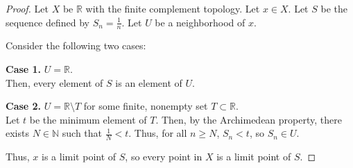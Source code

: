 \documentclass{article}
\newcommand{\R}{\mathbb R}
\begin{document}
\newpage{}
\begin{proof}
    Let $X$ be $\R$ with the finite complement topology.
    Let $x \in X$.
    Let $S$ be the sequence defined by $S_n = \frac1n$.
    Let $U$ be a neighborhood of $x$.

    Consider the following two cases:

    {\bf Case 1.} $U = \R$. \\
    Then, every element of $S$ is an element of $U$.

    {\bf Case 2.} $U = \R \setminus T$ for some finite, nonempty set $T \subset \R$. \\
    Let $t$ be the minimum element of $T$.
    Then, by the Archimedean property, there exists $N \in \mathbb N$ such that $\frac1N < t$.
    Thus, for all $n \geq N$, $S_n < t$, so $S_n \in U$.

    Thus, $x$ is a limit point of $S$, so every point in $X$ is a limit point of $S$.
\end{proof}
\end{document}
